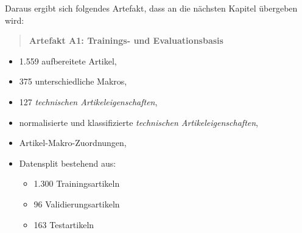 Daraus ergibt sich folgendes Artefakt, dass an die nächsten Kapitel übergeben wird: 

\begin{quote} 
    \textbf{Artefakt A1: Trainings- und Evaluationsbasis} 
\end{quote} 
\begin{itemize} 
    \item 1.559 aufbereitete Artikel,
    \item 375 unterschiedliche Makros,
    \item 127 \textit{technischen Artikeleigenschaften},
    \item normalisierte und klassifizierte \textit{technischen Artikeleigenschaften},
    \item Artikel-Makro-Zuordnungen,
    \item Datensplit bestehend aus: 
    \begin{itemize} 
        \item 1.300 Trainingsartikeln
        \item 96 Validierungsartikeln
        \item 163 Testartikeln
    \end{itemize} 
\end{itemize} 




        
        
        
